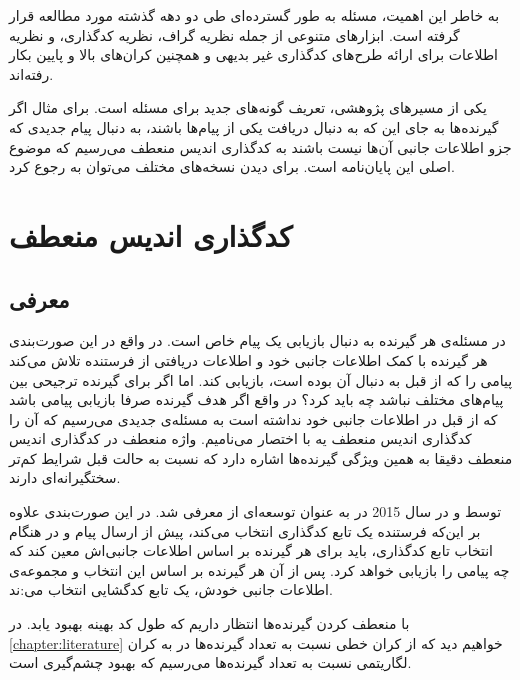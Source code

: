 به خاطر این اهمیت، مسئله \icod به طور گسترده‌ای طی دو دهه گذشته مورد مطالعه قرار گرفته است. ابزارهای متنوعی از جمله نظریه گراف، نظریه کدگذاری، و نظریه اطلاعات برای ارائه طرح‌های کدگذاری غیر بدیهی
\cite{25, 101, 22, 43, 114, 29, 8, 104, 81, 130, 7, 9, 149, 116, 80, 141, 146, 162}
و همچنین کران‌‌های بالا و پایین 
\cite{160, 22, 55, 28, 17, 141}
 بکار رفته‌اند.
 
 یکی از مسیرهای پژوهشی، تعریف گونه‌های جدید برای مسئله است. برای مثال اگر گیرنده‌ها به جای این که به دنبال دریافت یکی از پیام‌ها باشند، به دنبال پیام جدیدی که جزو اطلاعات جانبی آن‌ها نیست باشند به کدگذاری اندیس منعطف می‌رسیم که موضوع اصلی این پایان‌نامه است. برای دیدن نسخه‌های مختلف می‌توان به
 \cite{pliablefirstpaper, verypliable, byrne2023preferential}
 رجوع کرد.
 \pagebreak
 \section{کدگذاری اندیس منعطف}
 
 \subsection{معرفی}
 در مسئله‌ی
 \icod
 هر گیرنده به دنبال بازیابی یک پیام خاص است. در واقع در این صورت‌بندی هر گیرنده با کمک اطلاعات جانبی خود و اطلاعات دریافتی از فرستنده تلاش می‌کند پیامی را که از قبل به دنبال آن بوده است، بازیابی کند. اما اگر برای گیرنده ترجیحی بین پیام‌های مختلف نباشد چه باید کرد؟ در واقع اگر هدف گیرنده صرفا بازیابی پیامی باشد که از قبل در اطلاعات جانبی خود نداشته است به مسئله‌ی جدیدی می‌رسیم که آن را کدگذاری اندیس منعطف یه با اختصار \picod می‌نامیم. واژه منعطف در کدگذاری اندیس منعطف دقیقا به همین ویژگی گیرنده‌ها اشاره دارد که نسبت به حالت قبل شرایط کم‌تر سختگیرانه‌ای دارند.
 
 \picod توسط 
 و 
  در سال 2015 در
 \cite{pliablefirstpaper}
 به عنوان توسعه‌ای از \icod معرفی شد. در این صورت‌بندی علاوه بر این‌که فرستنده یک تابع کدگذاری انتخاب می‌کند، پیش از ارسال پیام و در هنگام انتخاب تابع کدگذاری، باید برای هر گیرنده بر اساس اطلاعات جانبی‌اش معین کند که چه پیامی را بازيابی خواهد کرد. پس از آن هر گیرنده بر اساس این انتخاب و مجموعه‌ی اطلاعات جانبی خودش، یک تابع کدگشایی انتخاب می‌:ند.
 
 با منعطف کردن گیرنده‌ها انتظار داریم که طول کد بهینه بهبود یابد. در 
 \autoref{chapter:literature}
 خواهیم دید که از کران خطی نسبت به تعداد گیرنده‌ها در
 \icod
 به کران لگاریتمی نسبت به تعداد گیرنده‌ها می‌رسیم که بهبود چشم‌گیری است.
 
